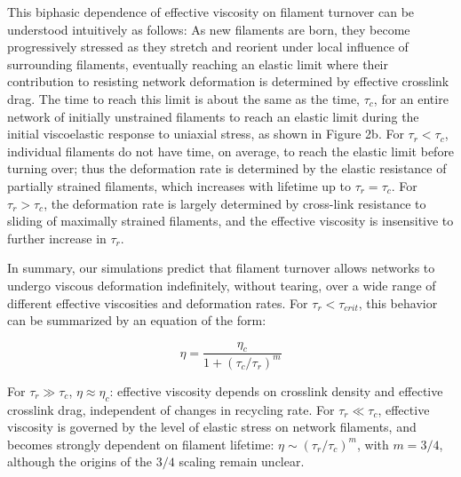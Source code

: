 \documentclass[10pt,letterpaper]{article}
\begin{document}
This biphasic dependence of effective viscosity on filament turnover can be understood intuitively as follows:  As new filaments are born, they become progressively stressed as they stretch and reorient under local influence of surrounding filaments, eventually reaching an elastic limit where their contribution to resisting network deformation is determined by effective crosslink drag.  The time to reach this limit is about the same as the time, $\tau_c$, for an entire network of initially unstrained filaments to reach an elastic limit during the initial viscoelastic response to uniaxial stress, as shown in Figure 2b.  For $\tau_r < \tau_c$, individual filaments do not have time, on average, to reach the elastic limit before turning over; thus the deformation rate is determined by the elastic resistance of partially strained filaments, which increases with lifetime up to $\tau_r = \tau_c$. For $\tau_r > \tau_c$, the deformation rate is largely determined by cross-link resistance to sliding of maximally strained filaments, and the effective viscosity is insensitive to further increase in  $\tau_r$.

In summary, our simulations predict that filament turnover allows networks to undergo viscous deformation indefinitely, without tearing, over a wide range of different effective viscosities and deformation rates. For $\tau_r < \tau_{crit}$, this behavior can be summarized by an equation of the form:

\begin{equation}
\label{eqn:simple_eta}
\eta = \frac{\eta_c}{1+(\tau_c/\tau_r)^m}  
\end{equation}

For $\tau_r \gg \tau_c$, $\eta\approx\eta_c$: effective viscosity depends on crosslink density and effective crosslink drag, independent of changes in recycling rate. For $\tau_r\ll\tau_c$,  effective viscosity is governed by the level of elastic stress on network filaments, and becomes strongly dependent on filament lifetime: $\eta\sim(\tau_r/\tau_c)^m$, with $m=3/4$, although the origins of the $3/4$ scaling remain unclear.
\end{document}
